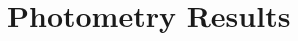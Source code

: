 \documentclass[%
aip,
jmp,
reprint,
floatfix
]{revtex4-1}
\begin{document}
	\begin{table}[h!]
		\centering
		
		\label{table:log}
	\end{table}

	\section{Photometry Results} \label{sec:res}
	
	\begin{table}[h!]
		\centering
		
		\label{table:fullresv}
	\end{table}

	\begin{table}[h!]
		\centering
		
		\label{table:fullresb}
	\end{table}
\end{document}

